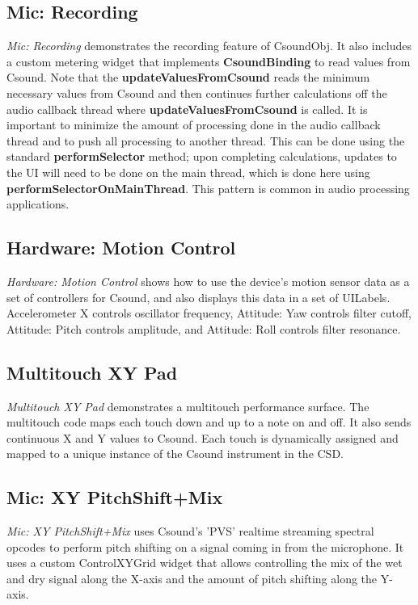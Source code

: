 \documentclass[11pt]{article}
\begin{document}
\subsection{Mic: Recording}

\emph{Mic: Recording} demonstrates the recording feature of CsoundObj.  It also includes a custom metering widget that implements \textbf{CsoundBinding} to read values from Csound.  Note that the \textbf{updateValuesFromCsound} reads the minimum necessary values from Csound and then continues further calculations off the audio callback thread where \textbf{updateValuesFromCsound} is called.  It is important to minimize the amount of processing done in the audio callback thread and to push all processing to another thread.  This can be done using the standard \textbf{performSelector} method; upon completing calculations, updates to the UI will need to be done on the main thread, which is done here using \textbf{performSelectorOnMainThread}.  This pattern is common in audio processing applications.

\subsection{Hardware: Motion Control}

\emph{Hardware: Motion Control} shows how to use the device's motion sensor data as a set of controllers for Csound, and also displays this data in a set of UILabels. Accelerometer X controls oscillator frequency, Attitude: Yaw controls filter cutoff, Attitude: Pitch controls amplitude, and Attitude: Roll controls filter resonance.

\subsection{Multitouch XY Pad}

\emph{Multitouch XY Pad} demonstrates a multitouch performance surface. The multitouch code maps each touch down and up to a note on and off.  It also sends continuous X and Y values to Csound.  Each touch is dynamically assigned and mapped to a unique instance of the Csound instrument in the CSD.


\subsection{Mic: XY PitchShift+Mix}

\emph{Mic: XY PitchShift+Mix} uses Csound's 'PVS' realtime streaming spectral opcodes to perform pitch shifting on a signal coming in from the microphone.  It uses a custom ControlXYGrid widget that allows controlling the mix of the wet and dry signal along the X-axis and the amount of pitch shifting along the Y-axis.
\end{document}
